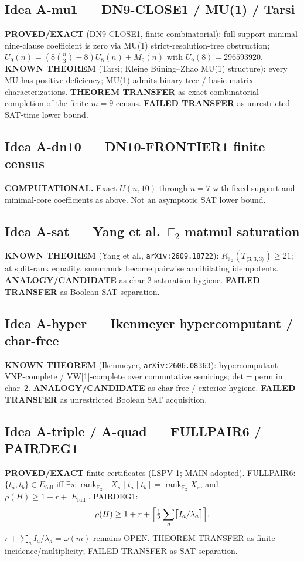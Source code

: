 \documentclass[11pt]{article}
\begin{document}
\subsection*{Idea A-mu1 --- DN9-CLOSE1 / MU(1) / Tarsi}
\textbf{PROVED/EXACT} (DN9-CLOSE1, finite combinatorial): full-support minimal
nine-clause coefficient is zero via MU(1) strict-resolution-tree obstruction;
$U_9(n)=(8\binom{n}{3}-8)U_8(n)+M_9(n)$ with $U_9(8)=296593920$.
\textbf{KNOWN THEOREM} (Tarsi; Kleine B\"uning--Zhao MU(1) structure): every MU
has positive deficiency; MU(1) admits binary-tree / basic-matrix characterizations.
\textbf{THEOREM TRANSFER} as exact combinatorial completion of the finite $m=9$
census.
\textbf{FAILED TRANSFER} as unrestricted SAT-time lower bound.

\subsection*{Idea A-dn10 --- DN10-FRONTIER1 finite census}
\textbf{COMPUTATIONAL.} Exact $U(n,10)$ through $n=7$ with fixed-support and
minimal-core coefficients as above. Not an asymptotic SAT lower bound.

\subsection*{Idea A-sat --- Yang et al.\ $\mathbb F_2$ matmul saturation}
\textbf{KNOWN THEOREM} (Yang et al., \texttt{arXiv:2609.18722}):
$R_{\mathbb F_2}(T_{\langle 3,3,3\rangle})\ge 21$; at split-rank equality,
summands become pairwise annihilating idempotents.
\textbf{ANALOGY/CANDIDATE} as char-$2$ saturation hygiene.
\textbf{FAILED TRANSFER} as Boolean SAT separation.

\subsection*{Idea A-hyper --- Ikenmeyer hypercomputant / char-free}
\textbf{KNOWN THEOREM} (Ikenmeyer, \texttt{arXiv:2606.08363}): hypercomputant
VNP-complete / VW[1]-complete over commutative semirings; det$=$perm in char~$2$.
\textbf{ANALOGY/CANDIDATE} as char-free / exterior hygiene.
\textbf{FAILED TRANSFER} as unrestricted Boolean SAT acquisition.

\subsection*{Idea A-triple / A-quad --- FULLPAIR6 / PAIRDEG1}
\textbf{PROVED/EXACT} finite certificates (LSPV-1; MAIN-adopted).
FULLPAIR6: $\{t_a,t_b\}\in E_{\mathrm{full}}$ iff $\exists s:
\operatorname{rank}_{\mathbb F_2}[X_s\mid t_a\mid t_b]=\operatorname{rank}_{\mathbb F_2}X_s$,
and $\rho(H)\ge 1+r+|E_{\mathrm{full}}|$. PAIRDEG1:
\[
\rho(H)\ge 1+r+\Bigl\lceil\tfrac12\sum_a\bigl\lceil I_a/\lambda_a\bigr\rceil\Bigr\rceil.
\]
$r+\sum_a I_a/\lambda_a=\omega(m)$ remains OPEN. THEOREM TRANSFER as finite
incidence/multiplicity; FAILED TRANSFER as SAT separation.
\end{document}
